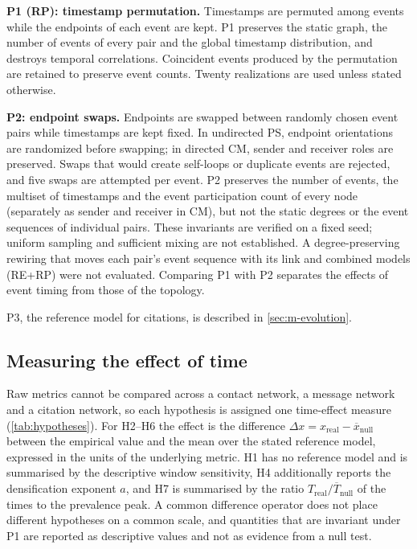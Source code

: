 \textbf{P1 (RP): timestamp permutation.}
Timestamps are permuted among events while the endpoints of each event are kept. P1
preserves the static graph, the number of events of every pair and the global timestamp
distribution, and destroys temporal correlations. Coincident events produced by the
permutation are retained to preserve event counts. Twenty realizations are used unless
stated otherwise.

\textbf{P2: endpoint swaps.}
Endpoints are swapped between randomly chosen event pairs while timestamps are kept
fixed. In undirected PS, endpoint orientations are randomized before swapping; in directed
CM, sender and receiver roles are preserved. Swaps that would create self-loops or duplicate
events are rejected, and five swaps are attempted per event. P2 preserves the number of
events, the multiset of timestamps and the event participation count of every node
(separately as sender and receiver in CM), but not the static degrees or the event
sequences of individual pairs. These invariants are verified on a fixed seed; uniform
sampling and sufficient mixing are not established. A degree-preserving rewiring that
moves each pair's event sequence with its link \citep{holme2012temporal} and combined
models (RE+RP) were not evaluated. Comparing P1 with P2 separates the effects of event
timing from those of the topology.

P3, the reference model for citations, is described in \cref{sec:m-evolution}.

\subsection{Measuring the effect of time}
\label{sec:time-effect}
Raw metrics cannot be compared across a contact network, a message network and a citation
network, so each hypothesis is assigned one time-effect measure (\cref{tab:hypotheses}).
For H2--H6 the effect is the difference $\Delta x=x_{\mathrm{real}}-\overline{x}_{\mathrm{null}}$
between the empirical value and the mean over the stated reference model, expressed in the
units of the underlying metric. H1 has no reference model and is summarised by the
descriptive window sensitivity, H4 additionally reports the densification exponent $a$, and
H7 is summarised by the ratio $T_{\mathrm{real}}/\overline T_{\mathrm{null}}$ of the times to
the prevalence peak. A common difference operator does not place different hypotheses on a
common scale, and quantities that are invariant under P1 are reported as descriptive values
and not as evidence from a null test.

